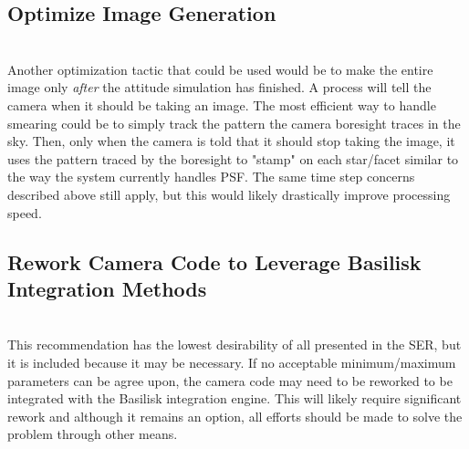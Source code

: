 \documentclass[]{DINOReportMemo}
\begin{document}
    \subsection{Optimize Image Generation} \\
    Another optimization tactic that could be used would be to make the entire image only \textit{after} the attitude simulation has finished. A process will tell the camera when it should be taking an image. The most efficient way to handle smearing could be to simply track the pattern the camera boresight traces in the sky. Then, only when the camera is told that it should stop taking the image, it uses the pattern traced by the boresight to "stamp" on each star/facet similar to the way the system currently handles PSF. The same time step concerns described above still apply, but this would likely drastically improve processing speed.
    \subsection{Rework Camera Code to Leverage Basilisk Integration Methods}\\
    This recommendation has the lowest desirability of all presented in the SER, but it is included because it may be necessary. If no acceptable minimum/maximum parameters can be agree upon, the camera code may need to be reworked to be integrated with the Basilisk integration engine. This will likely require significant rework and although it remains an option, all efforts should be made to solve the problem through other means.
\end{document}
